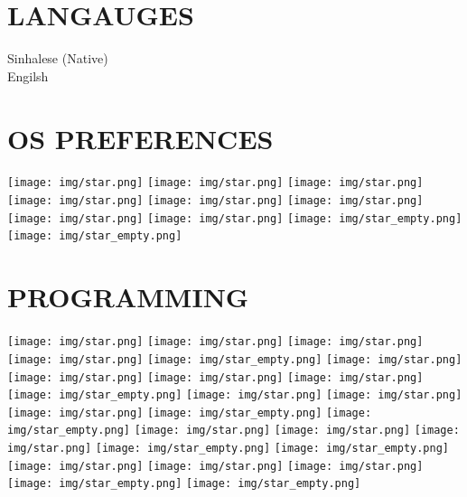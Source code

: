 \documentclass[]{cv-class}
\begin{document}
\begin{aside}
  \section{LANGAUGES}
  	{\whitebodyfont Sinhalese (Native)\\
    Engilsh}
    ~ 
  \section{OS PREFERENCES}
    {\texttt{[image: img/star.png]}
    \texttt{[image: img/star.png]}
    \texttt{[image: img/star.png]}
    \texttt{[image: img/star.png]}
    \texttt{[image: img/star.png]}}
    {\texttt{[image: img/star.png]}
    \texttt{[image: img/star.png]}
    \texttt{[image: img/star.png]}
    \texttt{[image: img/star\_empty.png]}
    \texttt{[image: img/star\_empty.png]}}
    ~
  \section{PROGRAMMING}
    {\texttt{[image: img/star.png]}
    \texttt{[image: img/star.png]}
    \texttt{[image: img/star.png]}
    \texttt{[image: img/star.png]}
    \texttt{[image: img/star\_empty.png]}}
    {\texttt{[image: img/star.png]}
    \texttt{[image: img/star.png]}
    \texttt{[image: img/star.png]}
    \texttt{[image: img/star.png]}
    \texttt{[image: img/star\_empty.png]}}
    {\texttt{[image: img/star.png]}
    \texttt{[image: img/star.png]}
    \texttt{[image: img/star.png]}
    \texttt{[image: img/star\_empty.png]}
    \texttt{[image: img/star\_empty.png]}}
    {\texttt{[image: img/star.png]}
    \texttt{[image: img/star.png]}
    \texttt{[image: img/star.png]}
    \texttt{[image: img/star\_empty.png]}
    \texttt{[image: img/star\_empty.png]}}
    {\texttt{[image: img/star.png]}
    \texttt{[image: img/star.png]}
    \texttt{[image: img/star.png]}
    \texttt{[image: img/star\_empty.png]}
    \texttt{[image: img/star\_empty.png]}}
    ~
\end{aside}
\end{document}
